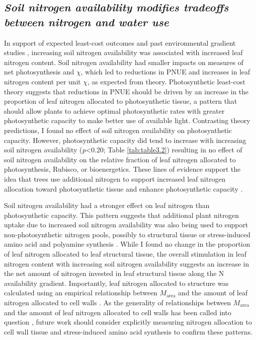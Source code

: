 \subsection{\textit{Soil nitrogen availability modifies tradeoffs between nitrogen and water use}}
\noindent In support of expected least-cost outcomes and past environmental gradient studies , increasing soil nitrogen availability was associated with increased leaf nitrogen content. Soil nitrogen availability had smaller impacts on measures of net photosynthesis and $\chi$, which led to reductions in PNUE and increases in leaf nitrogen content per unit $\chi$, as expected from theory. Photosynthetic least-cost theory suggests that reductions in PNUE should be driven by an increase in the proportion of leaf nitrogen allocated to photosynthetic tissue, a pattern that should allow plants to achieve optimal photosynthetic rates with greater photosynthetic capacity to make better use of available light. Contrasting theory predictions, I found no effect of soil nitrogen availability on photosynthetic capacity. However, photosynthetic capacity did tend to increase with increasing soil nitrogen availability (\textit{p}<0.20; Table \ref{tab:table3.2}) resulting in no effect of soil nitrogen availability on the relative fraction of leaf nitrogen allocated to photosynthesis, Rubisco, or bioenergetics. These lines of evidence support the idea that trees use additional nitrogen to support increased leaf nitrogen allocation toward photosynthetic tissue and enhance photosynthetic capacity .

Soil nitrogen availability had a stronger effect on leaf nitrogen than photosynthetic capacity. This pattern suggests that additional plant nitrogen uptake due to increased soil nitrogen availability was also being used to support non-photosynthetic nitrogen pools, possibly to structural tissue or stress-induced amino acid and polyamine synthesis . While I found no change in the proportion of leaf nitrogen allocated to leaf structural tissue, the overall stimulation in leaf nitrogen content with increasing soil nitrogen availability suggests an increase in the net amount of nitrogen invested in leaf structural tissue along the N availability gradient. Importantly, leaf nitrogen allocated to structure was calculated using an empirical relationship between $M_\mathrm{area}$ and the amount of leaf nitrogen allocated to cell walls . As the generality of relationships between $M_\mathrm{area}$ and the amount of leaf nitrogen allocated to cell walls has been called into question , future work should consider explicitly measuring nitrogen allocation to cell wall tissue and stress-induced amino acid synthesis to confirm these patterns.
    
